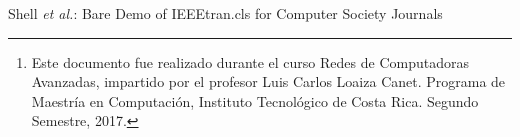 \documentclass[10pt,journal,compsoc]{IEEEtran}
\begin{document}
\author{\\
        \\
        \small{\texttt{\{ppiedra90, mfloresg\}}\texttt{@gmail.com}}%
\thanks{Este documento fue realizado durante el curso Redes de Computadoras Avanzadas, impartido por el profesor Luis Carlos Loaiza Canet. Programa de Maestría en Computación, Instituto Tecnológico de Costa Rica. Segundo Semestre, 2017.}
}


%
{Shell \MakeLowercase{\textit{et al.}}: Bare Demo of IEEEtran.cls for Computer Society Journals}


% 






\end{document}
